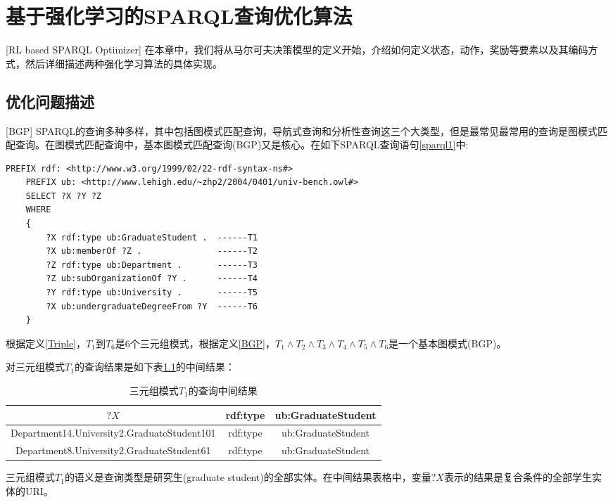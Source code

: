 \chapter{基于强化学习的SPARQL查询优化算法}[RL based SPARQL Optimizer]
在本章中，我们将从马尔可夫决策模型的定义开始，介绍如何定义状态，动作，奖励等要素以及其编码方式，然后详细描述两种强化学习算法的具体实现。

\section{优化问题描述}[BGP]
SPARQL的查询多种多样，其中包括图模式匹配查询，导航式查询和分析性查询这三个大类型，但是最常见最常用的查询是图模式匹配查询。在图模式匹配查询中，基本图模式匹配查询(BGP)又是核心。在如下SPARQL查询语句\ref{sparql1}中:
\begin{lstlisting}[caption={SPARQL查询语句},label={sparql1}]
    PREFIX rdf: <http://www.w3.org/1999/02/22-rdf-syntax-ns#>
    PREFIX ub: <http://www.lehigh.edu/~zhp2/2004/0401/univ-bench.owl#>
    SELECT ?X ?Y ?Z
    WHERE
    {
        ?X rdf:type ub:GraduateStudent .  ------T1
        ?X ub:memberOf ?Z .               ------T2
        ?Z rdf:type ub:Department .       ------T3
        ?Z ub:subOrganizationOf ?Y .      ------T4
        ?Y rdf:type ub:University .       ------T5        
        ?X ub:undergraduateDegreeFrom ?Y  ------T6
    }
\end{lstlisting}
根据定义\ref{Triple}，$T_1$到$T_6$是6个三元组模式，根据定义\ref{BGP}，$T_1\wedge T_2\wedge T_3\wedge T_4\wedge T_5\wedge T_6$是一个基本图模式(BGP)。

对三元组模式$T_1$的查询结果是如下表\ref{T1}的中间结果：
\begin{table}[htbp]
    \caption[table1]{三元组模式$T_1$的查询中间结果}
    \label{T1}
    \vspace{0.5em}\centering\wuhao
    \begin{tabular}{|c|c|c|}
    \toprule[1.5pt]
    $?X$ & rdf:type & ub:GraduateStudent\\
    \midrule[1pt]
    Department14.University2.GraduateStudent101 & rdf:type & ub:GraduateStudent\\
    Department8.University2.GraduateStudent61 & rdf:type &ub:GraduateStudent\\
    \bottomrule[1.5pt]
    \end{tabular}
\end{table}
三元组模式$T_1$的语义是查询类型是研究生(graduate student)的全部实体。在中间结果表格中，变量$?X$表示的结果是复合条件的全部学生实体的URI。

